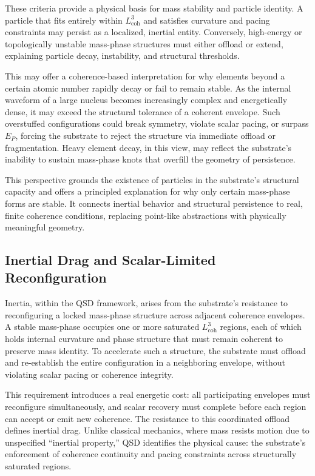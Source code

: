 \documentclass[entropy,article,submit,pdftex,moreauthors]{Definitions/mdpi}
\begin{document}
These criteria provide a physical basis for mass stability and particle identity. A particle that fits entirely within \texorpdfstring{\( L_{\text{coh}}^3 \)}{Lcoh\^{}3} and satisfies curvature and pacing constraints may persist as a localized, inertial entity. Conversely, high-energy or topologically unstable mass-phase structures must either offload or extend, explaining particle decay, instability, and structural thresholds.

This may offer a coherence-based interpretation for why elements beyond a certain atomic number rapidly decay or fail to remain stable. As the internal waveform of a large nucleus becomes increasingly complex and energetically dense, it may exceed the structural tolerance of a coherent envelope. Such overstuffed configurations could break symmetry, violate scalar pacing, or surpass \( E_P \), forcing the substrate to reject the structure via immediate offload or fragmentation. Heavy element decay, in this view, may reflect the substrate’s inability to sustain mass-phase knots that overfill the geometry of persistence.

This perspective grounds the existence of particles in the substrate’s structural capacity and offers a principled explanation for why only certain mass-phase forms are stable. It connects inertial behavior and structural persistence to real, finite coherence conditions, replacing point-like abstractions with physically meaningful geometry.

\subsection{Inertial Drag and Scalar-Limited Reconfiguration}
\label{sec:coherent-momentum-quantum}
Inertia, within the QSD framework, arises from the substrate's resistance to reconfiguring a locked mass-phase structure across adjacent coherence envelopes. A stable mass-phase occupies one or more saturated \texorpdfstring{\( L_{\text{coh}}^3 \)}{Lcoh\^{}3} regions, each of which holds internal curvature and phase structure that must remain coherent to preserve mass identity. To accelerate such a structure, the substrate must offload and re-establish the entire configuration in a neighboring envelope, without violating scalar pacing or coherence integrity.

This requirement introduces a real energetic cost: all participating envelopes must reconfigure simultaneously, and scalar recovery must complete before each region can accept or emit new coherence. The resistance to this coordinated offload defines inertial drag. Unlike classical mechanics, where mass resists motion due to unspecified “inertial property,” QSD identifies the physical cause: the substrate’s enforcement of coherence continuity and pacing constraints across structurally saturated regions.
\end{document}
